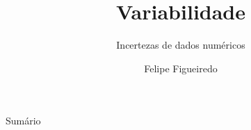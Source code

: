 \documentclass{beamer}
\title%
{Variabilidade}
\subtitle
{Incertezas de dados numéricos} %
\author%
{Felipe Figueiredo}%
\institute[] %
{
}
\date%
{}
\begin{document}
\begin{frame}
  \titlepage
\end{frame}

\begin{frame}{Sumário}
  \tableofcontents
\end{frame}








\end{document}
